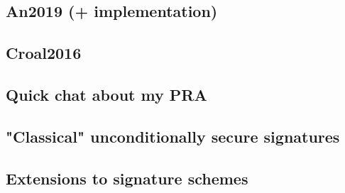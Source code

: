 \subsection{An2019 (+ implementation)}

\subsection{Croal2016}

\subsection{Quick chat about my PRA}

\subsection{"Classical" unconditionally secure signatures}

\subsection{Extensions to signature schemes}